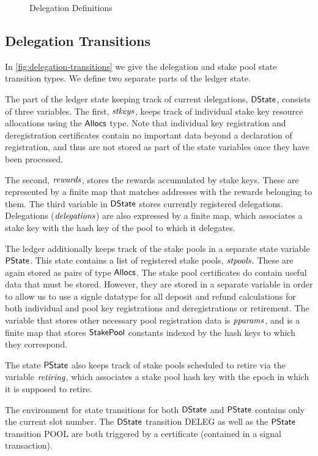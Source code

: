 \begin{figure}
  \caption{Delegation Definitions}
  \label{fig:delegation-definitons}
\end{figure}


\subsection{Delegation Transitions}
\label{sec:deleg-trans}


In \cref{fig:delegation-transitions} we give the delegation and stake pool
state transition types. We define two separate parts of the ledger state.

The part of the ledger state keeping track of current delegations, $\mathsf{DState}$,
consists of three variables. The first, $\mathit{stkeys}$, keeps track of individual
stake key resource allocations using the $\mathsf{Allocs}$ type.
Note that individual key registration
and deregistration certificates contain no important data beyond a declaration
of registration, and thus are not stored as part of the state variables once
they have been processed.

The second, $\mathit{rewards}$, stores the
rewards accumulated by stake keys. These are represented by
a finite
map that matches addresses with the rewards belonging to them. The third
variable in $\mathsf{DState}$ stores currently registered delegations.
Delegations ($\mathit{delegations}$) are also expressed by a finite map, which
associates a stake key with the hash key of the pool to which it delegates.

The ledger additionally keeps track of the stake pools in a separate state variable
$\mathsf{PState}$.
This state contains a list of registered stake pools, $\mathit{stpools}$.
These are again stored as pairs of type $\mathsf{Allocs}$. The stake pool certificates
do contain useful data that must be stored. However, they are stored in a
separate variable in order to allow us to use a signle datatype for
all deposit and refund calculations for both individual and pool key registrations
and deregistrations or retirement. The variable that stores other necessary pool
registration data is $\mathit{pparams}$, and is a finite map that stores $\mathsf{StakePool}$
constants indexed
by the hash keys to which they correspond.

The state $\mathsf{PState}$ also keeps track of
stake pools scheduled to retire via the variable $\mathit{retiring}$,
which associates
a stake pool hash key with the epoch in which it is supposed to retire.

The environment for state transitions for both $\mathsf{DState}$ and $\mathsf{PState}$ contains
only the current slot number. The $\mathsf{DState}$ transition DELEG as well as
the $\mathsf{PState}$ transition POOL are both triggered by a
certificate (contained in a signal transaction).


